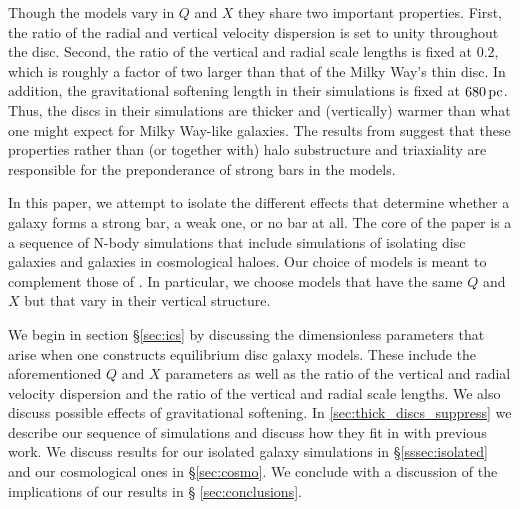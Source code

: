 Though the \citet{YurinSpringelStellarDisks} models vary in $Q$ and
$X$ they share two important properties.  First, the ratio of the
radial and vertical velocity dispersion is set to unity throughout the
disc.  Second, the ratio of the vertical and radial scale lengths is
fixed at $0.2$, which is roughly a factor of two larger than that of
the Milky Way's thin disc.  In addition, the gravitational softening length in their
simulations is fixed at $680\,{\rm pc}$.  Thus, the discs in their
simulations are thicker and (vertically) warmer than what one might
expect for Milky Way-like galaxies.  The results from
\citet{Klypin2009} suggest that these properties rather than (or
together with) halo substructure and triaxiality are responsible for
the preponderance of strong bars in the
\citet{YurinSpringelStellarDisks} models.

In this paper, we attempt to isolate the different effects that
determine whether a galaxy forms a strong bar, a weak one, or no bar
at all.  The core of the paper is a a sequence of N-body simulations
that include simulations of isolating disc galaxies and galaxies in
cosmological haloes.  Our choice of models is meant to complement
those of \citet{YurinSpringelStellarDisks}.  In particular, we choose
models that have the same $Q$ and $X$ but that vary in 
their vertical structure.  

We begin in section \S \ref{sec:ics} by discussing the dimensionless
parameters that arise when one constructs equilibrium disc galaxy
models.  These include the aforementioned $Q$ and $X$ parameters as
well as the ratio of the vertical and radial velocity dispersion and
the ratio of the vertical and radial scale lengths.  We also discuss
possible effects of gravitational softening.  In
\ref{sec:thick_discs_suppress} we describe our sequence of simulations
and discuss how they fit in with previous work.  We discuss results
for our isolated galaxy simulations in \S \ref{sssec:isolated} and our
cosmological ones in \S \ref{sec:cosmo}.  We conclude with a
discussion of the implications of our results in \S
\ref{sec:conclusions}.

